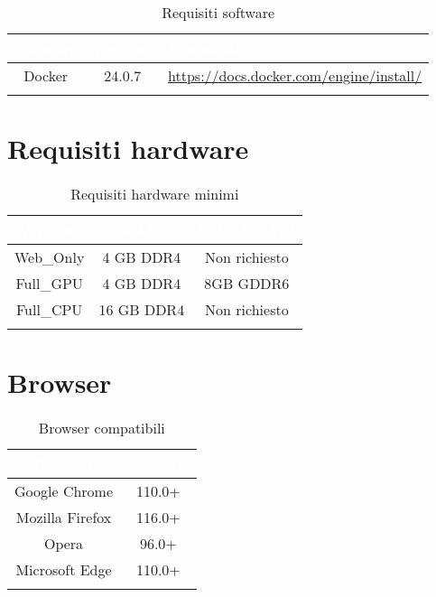\begingroup
\setlength{\tabcolsep}{10pt}
\renewcommand{\arraystretch}{1.5}
\begin{xltabular}{\textwidth}{| c | c | X |}
    \hline
     \textbf{\textcolor{white}{Software}} & \textbf{\textcolor{white}{Versione}} & \textbf{\textcolor{white}{Download}}\\
    \hline
    \endhead
    Docker & 24.0.7 & \url{https://docs.docker.com/engine/install/} \\
    \hline
     \caption{Requisiti software}
    \label{tab:reqsoft}
\end{xltabular}
\endgroup

\section{Requisiti hardware}
\begingroup
\setlength{\tabcolsep}{10pt}
\renewcommand{\arraystretch}{1.5}
\begin{xltabular}{\textwidth}{| c | c | c |}
    \hline
     \textbf{\textcolor{white}{Versione}} & \textbf{\textcolor{white}{RAM}} & \textbf{\textcolor{white}{GPU VRAM}}\\
    \hline
    \endhead
    Web\_Only & 4 GB DDR4 & Non richiesto \\
    \hline
    Full\_GPU & 4 GB DDR4 & 8GB GDDR6 \\
    \hline
    Full\_CPU & 16 GB DDR4 & Non richiesto \\
    \hline
     \caption{Requisiti hardware minimi}
    \label{tab:reqhard}
\end{xltabular}
\endgroup

\section{Browser}
\begingroup
\setlength{\tabcolsep}{10pt}
\renewcommand{\arraystretch}{1.5}
\begin{xltabular}{\textwidth}{| c | c |}
    \hline
     \textbf{\textcolor{white}{Browser}} & \textbf{\textcolor{white}{Versione}}\\
    \hline
    \endhead
    Google Chrome & 110.0+ \\
    \hline
    Mozilla Firefox & 116.0+ \\
    \hline
    Opera & 96.0+ \\
    \hline
    Microsoft Edge & 110.0+ \\
    \hline
     \caption{Browser compatibili}
    \label{tab:reqbrow}
\end{xltabular}
\endgroup


